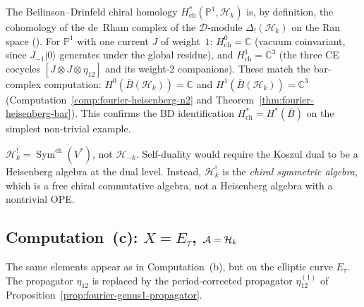 \begin{remark}
\label{rem:chiral-homology-heisenberg-verification}
The Beilinson--Drinfeld chiral homology
$H^*_{\mathrm{ch}}(\mathbb{P}^1, \mathcal{H}_k)$ is, by
definition, the cohomology of the de~Rham complex of the
$\mathcal{D}$-module $\Delta_!(\mathcal{H}_k)$ on the Ran space
(\cite[\S4.1]{BD04}).  For $\mathbb{P}^1$ with one current $J$ of
weight~$1$: $H^0_{\mathrm{ch}} = \mathbb{C}$ (vacuum coinvariant,
since $J_{-1}|0\rangle$ generates under the global residue), and
$H^1_{\mathrm{ch}} = \mathbb{C}^3$ (the three CE cocycles
$[J \otimes J \otimes \eta_{12}]$ and its weight-$2$ companions).
These match the bar-complex computation:
$H^0(\bar{B}(\mathcal{H}_k)) = \mathbb{C}$ and
$H^1(\bar{B}(\mathcal{H}_k)) = \mathbb{C}^3$
(Computation~\ref{comp:fourier-heisenberg-n2} and
Theorem~\ref{thm:fourier-heisenberg-bar}).  This confirms the BD
identification $H^*_{\mathrm{ch}} = H^*(\bar{B})$ on the
simplest non-trivial example.
\end{remark}

\begin{remark}
\label{rem:fourier-heisenberg-not-selfdual}
$\mathcal{H}_k^! = \operatorname{Sym}^{\mathrm{ch}}(V^*)$, not
$\mathcal{H}_{-k}$.  Self-duality would require the Koszul dual to
be a Heisenberg algebra at the dual level.  Instead,
$\mathcal{H}_k^!$ is the \emph{chiral symmetric algebra}, which is a
free chiral commutative algebra, not a Heisenberg algebra with a
nontrivial OPE.
\end{remark}

\subsection*{Computation~(c): $X = E_\tau$,
  $\mathcal{A} = \mathcal{H}_k$}

The same elements appear as in Computation~(b), but on the elliptic
curve $E_\tau$.  The propagator $\eta_{12}$ is replaced by the
period-corrected propagator $\eta^{(1)}_{12}$ of
Proposition~\ref{prop:fourier-genus1-propagator}.

